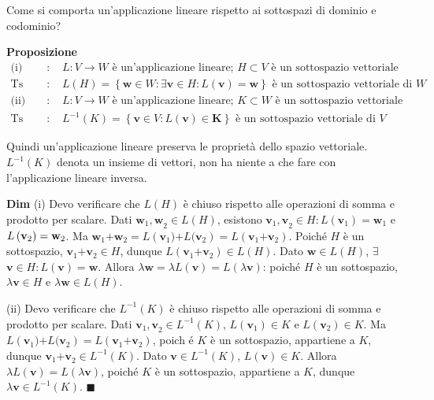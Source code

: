 \documentclass{article}
\begin{document}
Come si comporta un'applicazione lineare rispetto ai sottospazi di dominio e
codominio?

\textbf{Proposizione}%
\begin{eqnarray*}
\text{(i) Hp} &\text{: }&L:V\rightarrow W\text{ \`{e} un'applicazione
lineare; }H\subset V\text{ \`{e} un sottospazio vettoriale} \\
\text{Ts} &\text{: }&L\left( H\right) =\left\{ \mathbf{w}\in W:\exists \text{
}\mathbf{v}\in H:L\left( \mathbf{v}\right) =\mathbf{w}\right\} \text{ \`{e}
un sottospazio vettoriale di }W \\
\text{(ii) Hp} &\text{: }&L:V\rightarrow W\text{ \`{e} un'applicazione
lineare; }K\subset W\text{ \`{e} un sottospazio vettoriale} \\
\text{Ts} &\text{: }&L^{-1}\left( K\right) =\left\{ \mathbf{v}\in V:L\left( 
\mathbf{v}\right) \in \mathbf{K}\right\} \text{ \`{e} un sottospazio
vettoriale di }V
\end{eqnarray*}

Quindi un'applicazione lineare preserva le propriet\`{a} dello spazio
vettoriale. $L^{-1}\left( K\right) $ denota un insieme di vettori, non ha
niente a che fare con l'applicazione lineare inversa.

\textbf{Dim} (i) Devo verificare che $L\left( H\right) $ \`{e} chiuso
rispetto alle operazioni di somma e prodotto per scalare. Dati $\mathbf{w}%
_{1}\mathbf{,w}_{2}\in L\left( H\right) $, esistono $\mathbf{v}_{1}\mathbf{,v%
}_{2}\in H:L\left( \mathbf{v}_{1}\right) =\mathbf{w}_{1}$ e $L\left( \mathbf{%
v}_{2}\right) =\mathbf{w}_{2}$. Ma $\mathbf{w}_{1}\mathbf{+w}_{2}=L\left( 
\mathbf{v}_{1})\mathbf{+}L(\mathbf{v}_{2}\right) =L\left( \mathbf{v}_{1}%
\mathbf{+v}_{2}\right) $. Poich\'{e} $H$ \`{e} un sottospazio, $\mathbf{v}%
_{1}\mathbf{+v}_{2}\in H$, dunque $L\left( \mathbf{v}_{1}\mathbf{+v}%
_{2}\right) \in L\left( H\right) $. Dato $\mathbf{w}\in L\left( H\right) $, $%
\exists $ $\mathbf{v}\in H:L\left( \mathbf{v}\right) =\mathbf{w}$. Allora $%
\lambda \mathbf{w=}\lambda L\left( \mathbf{v}\right) =L\left( \lambda 
\mathbf{v}\right) $: poich\'{e} $H$ \`{e} un sottospazio, $\lambda \mathbf{v}%
\in H$ e $\lambda \mathbf{w}\in L\left( H\right) $.

(ii) Devo verificare che $L^{-1}\left( K\right) $ \`{e} chiuso rispetto alle
operazioni di somma e prodotto per scalare. Dati $\mathbf{v}_{1}\mathbf{,v}%
_{2}\in L^{-1}\left( K\right) $, $L\left( \mathbf{v}_{1}\right) \in K$ e $%
L\left( \mathbf{v}_{2}\right) \in K$. Ma $L\left( \mathbf{v}_{1})\mathbf{+}L(%
\mathbf{v}_{2}\right) =L\left( \mathbf{v}_{1}\mathbf{+v}_{2}\right) $, poich%
\'{e} $K$ \`{e} un sottospazio, appartiene a $K$, dunque $\mathbf{v}_{1}%
\mathbf{+v}_{2}\in L^{-1}\left( K\right) $. Dato $\mathbf{v}\in L^{-1}\left(
K\right) $, $L\left( \mathbf{v}\right) \in K$. Allora $\lambda L\left( 
\mathbf{v}\right) =L\left( \lambda \mathbf{v}\right) $, poich\'{e} $K$ \`{e}
un sottospazio, appartiene a $K$, dunque $\lambda \mathbf{v}\in L^{-1}\left(
K\right) $. $\blacksquare $
\end{document}
